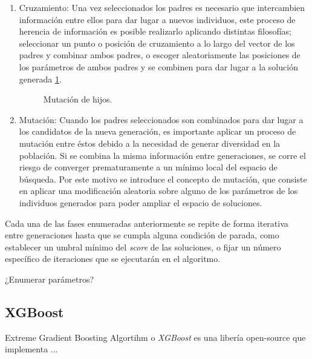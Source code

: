 \begin{enumerate}
                \item Cruzamiento:
                        Una vez seleccionados los padres es necesario que intercambien información entre ellos para dar lugar a nuevos individuos, este proceso de herencia de información es posible realizarlo aplicando distintas filosofías; seleccionar un punto o posición de cruzamiento a lo largo del vector de los padres y combinar ambos padres, o escoger aleatoriamente las posiciones de los parámetros de ambos padres y se combinen para dar lugar a la solución generada \ref{ParentsMatingMutation}.

                        \begin{figure}[h]
                            \centering
                            
                            \caption{Mutación de hijos.}
                            \label{ParentsMatingMutation}
                        \end{figure}

                \item Mutación:
                        Cuando los padres seleccionados son combinados para dar lugar a los candidatos de la nueva generación, es importante aplicar un proceso de mutación entre éstos debido a la necesidad de generar diversidad en la población. Si se combina la misma información entre generaciones, se corre el riesgo de converger prematuramente a un mínimo local del espacio de búsqueda. Por este motivo se introduce el concepto de mutación, que consiste en aplicar una modificación aleatoria sobre alguno de los parámetros de los individuos generados para poder ampliar el espacio de soluciones. 
            \end{enumerate}

            Cada una de las fases enumeradas anteriormente se repite de forma iterativa entre generaciones hasta que se cumpla alguna condición de parada, como establecer un umbral mínimo del \textit{score} de las soluciones, o fijar un número específico de iteraciones que se ejecutarán en el algoritmo.

            ¿Enumerar parámetros?


        \subsection {XGBoost}

            
            Extreme Gradient Boosting Algortihm o \textit{XGBoost} \citep{XGBoostTutorial} \cite{Hubel1968} es una libería open-source que implementa ...

